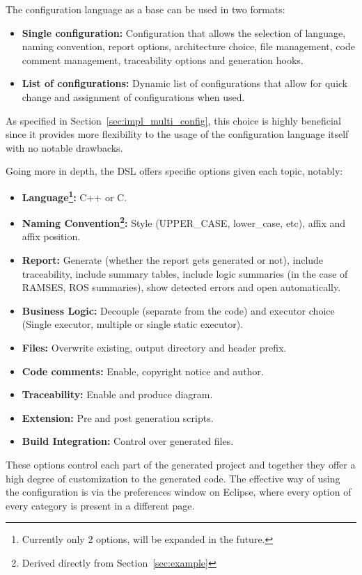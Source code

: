 The configuration language as a base can be used in two formats:

\begin{itemize}  
	\item \textbf{Single configuration: } Configuration that allows the selection of language, naming convention, report options, architecture choice, file management, code comment management, traceability options and generation hooks.
	\item \textbf{List of configurations: } Dynamic list of configurations that allow for quick change and assignment of configurations when used.
\end{itemize}


As specified in Section~\ref{sec:impl_multi_config}, this choice is highly beneficial since it provides more flexibility to the usage of the configuration language itself with no notable drawbacks.

Going more in depth, the \gls{DSL} offers specific options given each topic, notably:

\begin{itemize}  
	\item \textbf{Language\footnote{Currently only 2 options, will be expanded in the future.}: } C++ or C.
	\item \textbf{Naming Convention\footnote{Derived directly from Section~\ref{sec:example}}: } Style (UPPER\_CASE, lower\_case, etc), affix and affix position.
	\item \textbf{Report: } Generate (whether the report gets generated or not), include traceability, include summary tables, include logic summaries (in the case of \gls{RAMSES}, \gls{ROS} summaries), show detected errors and open automatically.
	\item \textbf{Business Logic: } Decouple (separate from the code) and executor choice (Single executor, multiple or single static executor).
	\item \textbf{Files: } Overwrite existing, output directory and header prefix.
	\item \textbf{Code comments: } Enable, copyright notice and author.
	\item \textbf{Traceability: } Enable and produce diagram.
	\item \textbf{Extension: } Pre and post generation scripts.
	\item \textbf{Build Integration: } Control over generated files.
\end{itemize}

These options control each part of the generated project and together they offer a high degree of customization to the generated code. The effective way of using the configuration is via the preferences window on Eclipse, where every option of every category is present in a different page.



